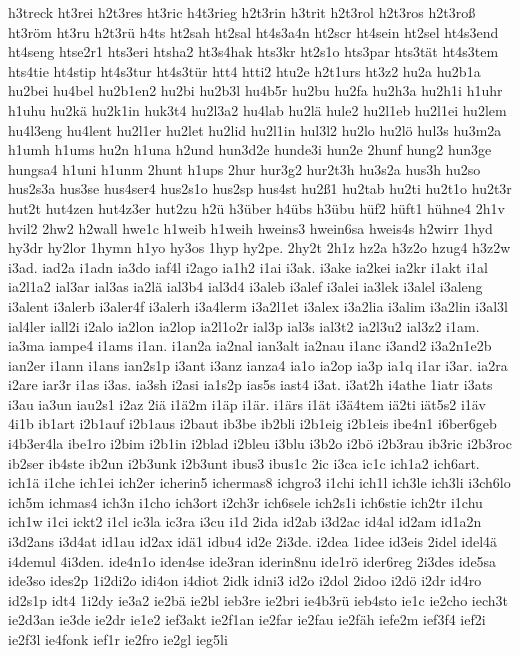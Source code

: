 {h3treck
ht3rei
h2t3res
ht3ric
h4t3rieg
h2t3rin
h3trit
h2t3rol
h2t3ros
h2t3roß
ht3röm
ht3ru
h2t3rü
h4ts
ht2sah
ht2sal
ht4s3a4n
ht2scr
ht4sein
ht2sel
ht4s3end
ht4seng
htse2r1
hts3eri
htsha2
ht3s4hak
hts3kr
ht2s1o
hts3par
hts3tät
ht4s3tem
hts4tie
ht4stip
ht4s3tur
ht4s3tür
htt4
htti2
htu2e
h2t1urs
ht3z2
hu2a
hu2b1a
hu2bei
hu4bel
hu2b1en2
hu2bi
hu2b3l
hu4b5r
hu2bu
hu2fa
hu2h3a
hu2h1i
h1uhr
h1uhu
hu2kä
hu2k1in
huk3t4
hu2l3a2
hu4lab
hu2lä
hule2
hu2l1eb
hu2l1ei
hu2lem
hu4l3eng
hu4lent
hu2l1er
hu2let
hu2lid
hu2l1in
hul3l2
hu2lo
hu2lö
hul3s
hu3m2a
h1umh
h1ums
hu2n
h1una
h2und
hun3d2e
hunde3i
hun2e
2hunf
hung2
hun3ge
hungsa4
h1uni
h1unm
2hunt
h1ups
2hur
hur3g2
hur2t3h
hu3s2a
hus3h
hu2so
hus2s3a
hus3se
hus4ser4
hus2s1o
hus2sp
hus4st
hu2ß1
hu2tab
hu2ti
hu2t1o
hu2t3r
hut2t
hut4zen
hut4z3er
hut2zu
h2ü
h3über
h4übs
h3übu
hüf2
hüft1
hühne4
2h1v
hvil2
2hw2
h2wall
hwe1c
h1weib
h1weih
hweins3
hwein6sa
hweis4s
h2wirr
1hyd
hy3dr
hy2lor
1hymn
h1yo
hy3os
1hyp
hy2pe.
2hy2t
2h1z
hz2a
h3z2o
hzug4
h3z2w
i3ad.
iad2a
i1adn
ia3do
iaf4l
i2ago
ia1h2
i1ai
i3ak.
i3ake
ia2kei
ia2kr
i1akt
i1al
ia2l1a2
ial3ar
ial3as
ia2lä
ial3b4
ial3d4
i3aleb
i3alef
i3alei
ia3lek
i3alel
i3aleng
i3alent
i3alerb
i3aler4f
i3alerh
i3a4lerm
i3a2l1et
i3alex
i3a2lia
i3alim
i3a2lin
i3al3l
ial4ler
iall2i
i2alo
ia2lon
ia2lop
ia2l1o2r
ial3p
ial3s
ial3t2
ia2l3u2
ial3z2
i1am.
ia3ma
iampe4
i1ams
i1an.
i1an2a
ia2nal
ian3alt
ia2nau
i1anc
i3and2
i3a2n1e2b
ian2er
i1ann
i1ans
ian2s1p
i3ant
i3anz
ianza4
ia1o
ia2op
ia3p
ia1q
i1ar
i3ar.
ia2ra
i2are
iar3r
i1as
i3as.
ia3sh
i2asi
ia1s2p
ias5s
iast4
i3at.
i3at2h
i4athe
1iatr
i3ats
i3au
ia3un
iau2s1
i2az
2iä
i1ä2m
i1äp
i1är.
i1ärs
i1ät
i3ä4tem
iä2ti
iät5s2
i1äv
4i1b
ib1art
i2b1auf
i2b1aus
i2baut
ib3be
ib2bli
i2b1eig
i2b1eis
ibe4n1
i6ber6geb
i4b3er4la
ibe1ro
i2bim
i2b1in
i2blad
i2bleu
i3blu
i3b2o
i2bö
i2b3rau
ib3ric
i2b3roc
ib2ser
ib4ste
ib2un
i2b3unk
i2b3unt
ibus3
ibus1c
2ic
i3ca
ic1c
ich1a2
ich6art.
ich1ä
i1che
ich1ei
ich2er
icherin5
ichermas8
ichgro3
i1chi
ich1l
ich3le
ich3li
i3ch6lo
ich5m
ichmas4
ich3n
i1cho
ich3ort
i2ch3r
ich6sele
ich2s1i
ich6stie
ich2tr
i1chu
ich1w
i1ci
ickt2
i1cl
ic3la
ic3ra
i3cu
i1d
2ida
id2ab
i3d2ac
id4al
id2am
id1a2n
i3d2ans
i3d4at
id1au
id2ax
idä1
idbu4
id2e
2i3de.
i2dea
1idee
id3eis
2idel
idel4ä
i4demul
4i3den.
ide4n1o
iden4se
ide3ran
iderin8nu
ide1rö
ider6reg
2i3des
ide5sa
ide3so
ides2p
1i2di2o
idi4on
i4diot
2idk
idni3
id2o
i2dol
2idoo
i2dö
i2dr
id4ro
id2s1p
idt4
1i2dy
ie3a2
ie2bä
ie2bl
ieb3re
ie2bri
ie4b3rü
ieb4sto
ie1c
ie2cho
iech3t
ie2d3an
ie3de
ie2dr
ie1e2
ief3akt
ie2f1an
ie2far
ie2fau
ie2fäh
iefe2m
ief3f4
ief2i
ie2f3l
ie4fonk
ief1r
ie2fro
ie2gl
ieg5li
}
